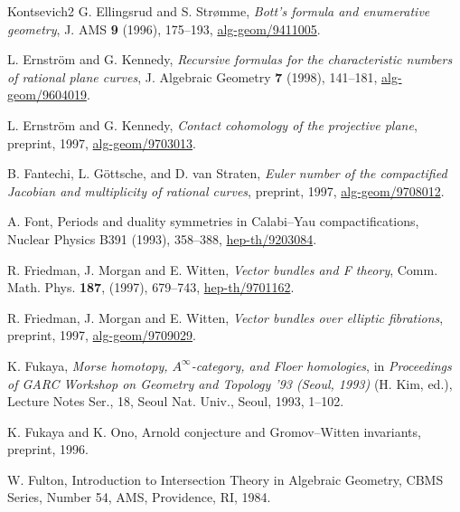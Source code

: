\begin{thebibliography}{Kontsevich2}
\hypertarget{bib:ES2}{} G. Ellingsrud and S. Strømme, \emph{Bott's formula and enumerative geometry}, J. AMS \textbf{9} (1996), 175--193, \href{https://arxiv.org/abs/alg-geom/9411005}{alg-geom/9411005}.

\hypertarget{bib:EK1}{} L. Ernström and G. Kennedy, \emph{Recursive formulas for the characteristic numbers of rational plane curves}, J. Algebraic Geometry \textbf{7} (1998), 141--181, \href{https://arxiv.org/abs/alg-geom/9604019}{alg-geom/9604019}.

\hypertarget{bib:EK2}{} L. Ernström and G. Kennedy, \emph{Contact cohomology of the projective plane}, preprint, 1997, \href{https://arxiv.org/abs/alg-geom/9703013}{alg-geom/9703013}.

\hypertarget{bib:FGvS}{} B. Fantechi, L. Göttsche, and D. van Straten, \emph{Euler number of the compactified Jacobian and multiplicity of rational curves}, preprint, 1997, \href{https://arxiv.org/abs/alg-geom/9708012}{alg-geom/9708012}.

\hypertarget{bib:Font}{}
A. Font, Periods and duality symmetries in Calabi--Yau compactifications,
Nuclear Physics B391 (1993), 358--388, \href{https://arxiv.org/abs/hep-th/9203084}{hep-th/9203084}.

\hypertarget{bib:FMW1}{} R. Friedman, J. Morgan and E. Witten, \emph{Vector bundles and F theory}, Comm. Math. Phys. \textbf{187}, (1997), 679--743, \href{https://arxiv.org/abs/hep-th/9701162}{hep-th/9701162}.

\hypertarget{bib:FMW2}{} R. Friedman, J. Morgan and E. Witten, \emph{Vector bundles over elliptic fibrations}, preprint, 1997, \href{https://arxiv.org/abs/alg-geom/9709029}{alg-geom/9709029}.

\hypertarget{bib:Fukaya}{} K. Fukaya, \emph{Morse homotopy, $A^\infty$-category, and Floer homologies}, in \emph{Proceedings of GARC Workshop on Geometry and Topology '93 (Seoul, 1993)} (H. Kim, ed.), Lecture Notes Ser., 18, Seoul Nat. Univ., Seoul, 1993, 1--102.

\hypertarget{bib:FO}{}
K. Fukaya and K. Ono, Arnold conjecture and Gromov--Witten invariants, preprint, 1996.

\hypertarget{bib:Fulton1}{}
W. Fulton, Introduction to Intersection Theory in Algebraic Geometry, CBMS Series, Number 54, AMS, Providence, RI, 1984.


\end{thebibliography}
